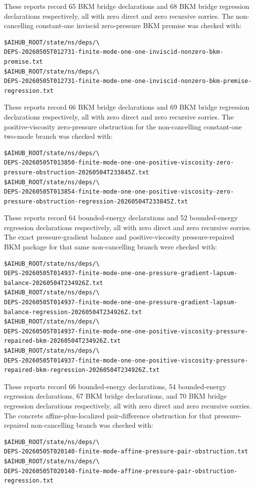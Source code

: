 \documentclass[11pt]{article}
\begin{document}
These reports record 65 BKM bridge declarations and 68 BKM bridge regression
declarations respectively, all with zero direct and zero recursive sorries.
The non-cancelling constant-one inviscid zero-pressure BKM premise was checked
with:
\begin{verbatim}
$AIHUB_ROOT/state/ns/deps/\
DEPS-20260505T012731-finite-mode-one-one-inviscid-nonzero-bkm-premise.txt
$AIHUB_ROOT/state/ns/deps/\
DEPS-20260505T012731-finite-mode-one-one-inviscid-nonzero-bkm-premise-regression.txt
\end{verbatim}
These reports record 66 BKM bridge declarations and 69 BKM bridge regression
declarations respectively, all with zero direct and zero recursive sorries.
The positive-viscosity zero-pressure obstruction for the non-cancelling
constant-one two-mode branch was checked with:
\begin{verbatim}
$AIHUB_ROOT/state/ns/deps/\
DEPS-20260505T013850-finite-mode-one-one-positive-viscosity-zero-pressure-obstruction-20260504T233845Z.txt
$AIHUB_ROOT/state/ns/deps/\
DEPS-20260505T013854-finite-mode-one-one-positive-viscosity-zero-pressure-obstruction-regression-20260504T233845Z.txt
\end{verbatim}
These reports record 64 bounded-energy declarations and 52 bounded-energy
regression declarations respectively, all with zero direct and zero recursive
sorries.
The exact pressure-gradient balance and positive-viscosity pressure-repaired
BKM package for that same non-cancelling branch were checked with:
\begin{verbatim}
$AIHUB_ROOT/state/ns/deps/\
DEPS-20260505T014937-finite-mode-one-one-pressure-gradient-lapsum-balance-20260504T234926Z.txt
$AIHUB_ROOT/state/ns/deps/\
DEPS-20260505T014937-finite-mode-one-one-pressure-gradient-lapsum-balance-regression-20260504T234926Z.txt
$AIHUB_ROOT/state/ns/deps/\
DEPS-20260505T014937-finite-mode-one-one-positive-viscosity-pressure-repaired-bkm-20260504T234926Z.txt
$AIHUB_ROOT/state/ns/deps/\
DEPS-20260505T014937-finite-mode-one-one-positive-viscosity-pressure-repaired-bkm-regression-20260504T234926Z.txt
\end{verbatim}
These reports record 66 bounded-energy declarations, 54 bounded-energy
regression declarations, 67 BKM bridge declarations, and 70 BKM bridge
regression declarations respectively, all with zero direct and zero recursive
sorries.
The concrete affine-plus-localized pair-difference obstruction for that
pressure-repaired non-cancelling branch was checked with:
\begin{verbatim}
$AIHUB_ROOT/state/ns/deps/\
DEPS-20260505T020140-finite-mode-affine-pressure-pair-obstruction.txt
$AIHUB_ROOT/state/ns/deps/\
DEPS-20260505T020140-finite-mode-affine-pressure-pair-obstruction-regression.txt
\end{verbatim}
\end{document}
